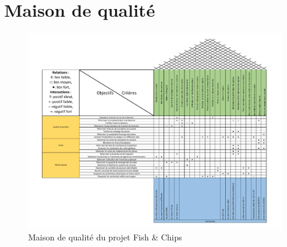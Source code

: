 


\newpage


\section{Maison de qualité}

\begin{figure}[htb!]
    \centering
    \includegraphics[width=\linewidth]{fig/MQ3.pdf}
    \caption{Maison de qualité du projet Fish \& Chips}
    \label{fig:maison_qualite}
\end{figure}
